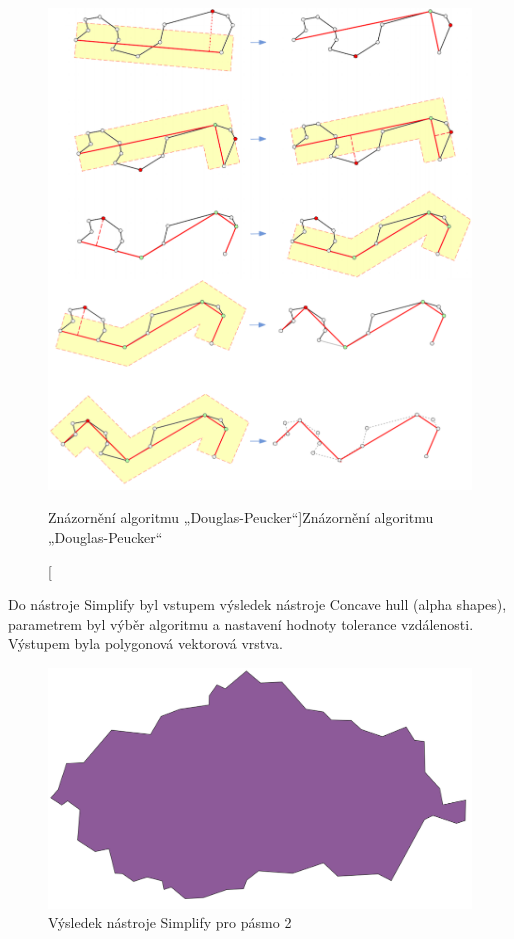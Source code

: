 \begin{figure}[H] \centering
    \includegraphics[width=400pt]{./pictures/douglas.png}
    \caption[Znázornění algoritmu „Douglas-Peucker“]{Znázornění algoritmu „Douglas-Peucker“ \cite{bayer-douglas}}
	\label{fig:douglas}              
\end{figure} 

Do nástroje Simplify byl vstupem výsledek nástroje Concave hull (alpha shapes), parametrem byl výběr algoritmu 
a nastavení hodnoty tolerance vzdálenosti. Výstupem byla polygonová vektorová vrstva.

\begin{figure}[H] \centering
    \includegraphics[width=400pt]{./pictures/simplify.png}
    \caption[Výsledek nástroje Simplify pro pásmo 2]{Výsledek nástroje Simplify pro pásmo 2}
	\label{fig:simplify}              
\end{figure}

